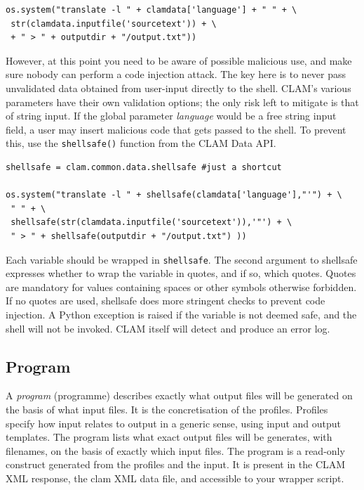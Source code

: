 \documentclass[a4paper,12pt,twoside,openright]{report}
\begin{document}
{ \small
\begin{verbatim}
os.system("translate -l " + clamdata['language'] + " " + \
 str(clamdata.inputfile('sourcetext')) + \
 + " > " + outputdir + "/output.txt"))
\end{verbatim}
}


However, at this point you need to be aware of possible malicious use, and make
sure nobody can perform a code injection attack. The key here is to never pass
unvalidated data obtained from user-input directly to the shell. CLAM's various
parameters have their own validation options; the only risk left to mitigate is
that of string input. If the global parameter \emph{language} would be a free
string input field, a user may insert malicious code that gets passed to the
shell. To prevent this, use the \texttt{shellsafe()} function from the CLAM
Data API. 


{ \small
\begin{verbatim}
shellsafe = clam.common.data.shellsafe #just a shortcut

os.system("translate -l " + shellsafe(clamdata['language'],"'") + \
 " " + \
 shellsafe(str(clamdata.inputfile('sourcetext')),'"') + \
 " > " + shellsafe(outputdir + "/output.txt") ))
\end{verbatim}
}

Each variable should be wrapped in \texttt{shellsafe}. The second argument to
shellsafe expresses whether to wrap the variable in quotes, and if so, which
quotes. Quotes are mandatory for values containing spaces or other symbols
otherwise forbidden. If no quotes are used, shellsafe does more stringent
checks to prevent code injection. A Python exception is raised if the variable
is not deemed safe, and the shell will not be invoked. CLAM itself will detect
and produce an error log.

\subsection{Program}
\label{sec:program}

A \emph{program} (programme) describes exactly what output files will be
generated on the basis of what input files. It is the concretisation of the
profiles. Profiles specify how input relates to output in a generic sense,
using input and output templates. The program lists what exact output files
will be generates, with filenames, on the basis of exactly which input files.
The program is a read-only construct generated from the profiles and the input.
It is present in the CLAM XML response, the clam XML data file, and accessible
to your wrapper script.
\end{document}
